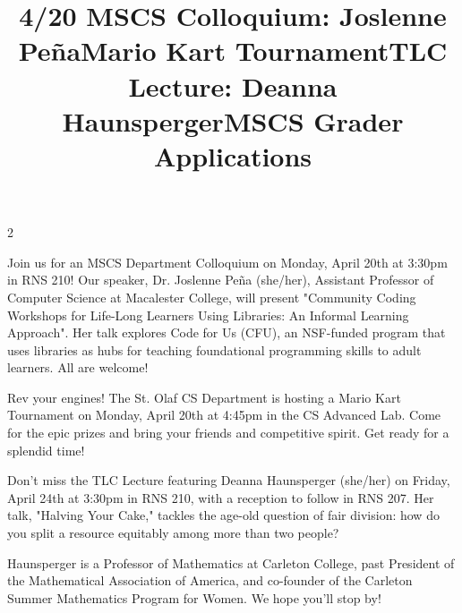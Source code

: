 \documentclass[12pt]{article}
\newcommand{\bolder}{\textbf}
\begin{document}
\begin{multicols}{2}
\begin{tcolorbox}[colback=white, colframe=black]
    \begin{center}
    \title{{\large \bolder{4/20 MSCS Colloquium: Joslenne Peña}}}
    \end{center}
\end{tcolorbox}

Join us for an MSCS Department Colloquium on Monday, April 20th at 3:30pm in RNS 210! Our speaker, Dr. Joslenne Peña (she/her), Assistant Professor of Computer Science at Macalester College, will present "Community Coding Workshops for Life-Long Learners Using Libraries: An Informal Learning Approach". Her talk explores Code for Us (CFU), an NSF-funded program that uses libraries as hubs for teaching foundational programming skills to adult learners. All are welcome!


\begin{tcolorbox}[colback=white, colframe=black]
    \begin{center}
    \title{{\large \bolder{Mario Kart Tournament}}}
    \end{center}
\end{tcolorbox}

Rev your engines! The St. Olaf CS Department is hosting a Mario Kart Tournament on Monday, April 20th at 4:45pm in the CS Advanced Lab. Come for the epic prizes and bring your friends and competitive spirit. Get ready for a splendid time!


\begin{tcolorbox}[colback=white, colframe=black]
    \begin{center}
    \title{{\large \bolder{TLC Lecture: Deanna Haunsperger}}}
    \end{center}
\end{tcolorbox}

Don't miss the TLC Lecture featuring Deanna Haunsperger (she/her) on Friday, April 24th at 3:30pm in RNS 210, with a reception to follow in RNS 207. Her talk, "Halving Your Cake," tackles the age-old question of fair division: how do you split a resource equitably among more than two people? 

Haunsperger is a Professor of Mathematics at Carleton College, past President of the Mathematical Association of America, and co-founder of the Carleton Summer Mathematics Program for Women. We hope you'll stop by!

\begin{tcolorbox}[colback=white, colframe=black]
    \begin{center}
    \title{{\large \bolder{MSCS Grader Applications}}}
    \end{center}
\end{tcolorbox}


\end{multicols}
\end{document}
